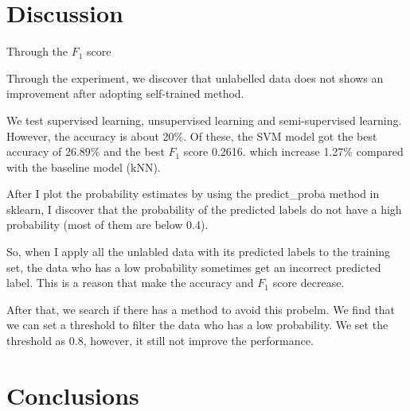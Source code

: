 \documentclass[11pt]{article}
\begin{document}
\section{Discussion}

Through the $F_1$ score 

Through the experiment, we discover that unlabelled data does not shows an improvement after adopting self-trained method.


We test supervised learning, unsupervised learning and semi-supervised learning. 
However, the accuracy is about 20\%.
Of these, the SVM model got the best accuracy of 26.89\% and the best $F_1$ score 0.2616.
which increase 1.27\% compared with the baseline model (kNN).


After I plot the probability estimates by using the predict\_proba method in sklearn,
I discover that the probability of the predicted labels do not have a high probability (most of them are below 0.4).

So, when I apply all the unlabled data with its predicted labels to the training set,
the data who has a low probability sometimes get an incorrect predicted label. 
This is a reason that make the accuracy and $F_1$ score decrease.

After that, we search if there has a method to avoid this probelm.
We find that we can set a threshold to filter the data who has a low probability. \cite{Self-trained-semi-supervised-learning}
We set the threshold as 0.8, however, it still not improve the performance.







\section{Conclusions}









\nocite{*}


\end{document}
